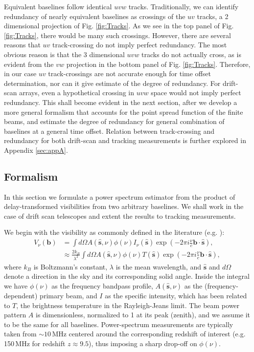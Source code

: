 \documentclass[twocolumn,apj,numberedappendix]{emulateapj}
\renewcommand\[{\begin{equation}}
\renewcommand\]{\end{equation}}
\begin{document}
Equivalent baselines follow identical $uvw$ tracks. Traditionally, we can identify
redundancy of nearly equivalent baselines as crossings
of the $uv$ tracks, a 2 dimensional projection of Fig. \ref{fig:Tracks}. As we see in the top panel of Fig. \ref{fig:Tracks}, there would be many such crossings. However, there are several reasons that $uv$ track-crossing do not imply perfect redundancy. The most obvious reason is that the 3 dimensional $uvw$ tracks do not actually cross, as is evident from the $vw$ projection in the bottom panel of Fig. \ref{fig:Tracks}. Therefore, in our case $uv$ track-crossings are
not accurate enough for time offset determination, nor can it give estimate of the degree of redundancy.   For drift-scan arrays, even a hypothetical crossing in $uvw$ space would not imply perfect redundancy. This shall become evident in the next section, after we develop a more general formalism that accounts for the point spread function of the finite beams, and estimate the degree of redundancy for general combination of baselines at a general time offset. Relation between track-crossing and redundancy for both drift-scan and tracking measurements is further explored in Appendix \ref{sec:appA}. 



\subsection{Formalism \label{sec:formalism}}
\label{sec:formalism}
In this section we formulate a power spectrum estimator from
the product of delay-transformed visibilities from two arbitrary baselines. We shall work in the case of drift scan telescopes and extent the results to tracking measurements. 

We begin with the visibility as commonly defined in the literature (e.g.
\citealt{TMS, first-paper}): 
\begin{equation}
\begin{aligned}V_{\nu}(\boldsymbol{b}) & =\int d\Omega A(\hat{\boldsymbol{s}},\nu)\phi(\nu)I_{\nu}(\hat{\boldsymbol{s}})\exp\left(-2\pi i\frac{\nu}{c}\boldsymbol{b}\cdot\hat{\boldsymbol{s}}\right),\\
 & \approx\frac{2k_{B}}{\lambda^{2}}\int d\Omega A(\hat{\boldsymbol{s}},\nu)\phi(\nu)T(\hat{\boldsymbol{s}})\exp\left(-2\pi i\frac{\nu}{c}\boldsymbol{b}\cdot\hat{\boldsymbol{s}}\right),
\end{aligned}
\label{eq:Vis1}
\end{equation}
where $k_B$ is Boltzmann's constant, $\lambda$ is the mean wavelength, and $\hat{\boldsymbol{s}}$ and $d \Omega$ denote a direction in the
sky and its corresponding solid angle. Inside the integral we have $\phi(\nu)$ as the frequency bandpass profile, $A(\hat{\boldsymbol{s}},\nu)$ as the (frequency-dependent) primary beam, and $I$ as the specific intensity, which has been
related to $T$, the brightness temperature in the Rayleigh-Jeans
limit. The beam power pattern $A$ is dimensionless,
normalized to 1 at its peak (zenith), and we assume it to be the same
for all baselines. Power-spectrum measurements are typically taken from $\sim10$\,MHz centered around the corresponding redshift of interest (e.g. 150\,MHz for redshift $z\approx9.5$), thus imposing a sharp drop-off on $\phi(\nu)$. 
\end{document}

